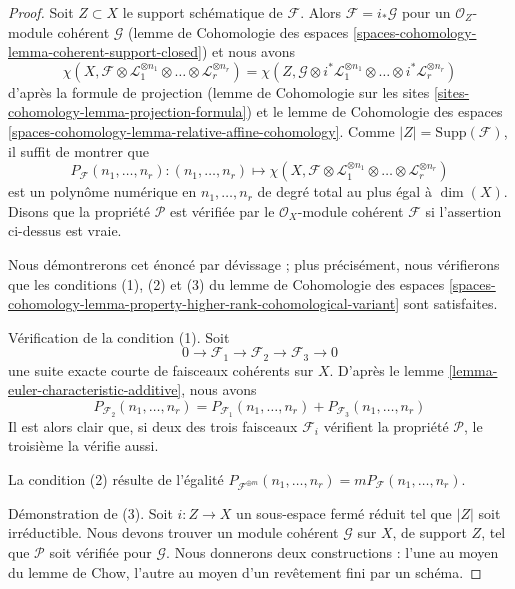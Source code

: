 \begin{proof}
Soit $Z \subset X$ le support schématique de $\mathcal{F}$.
Alors $\mathcal{F} = i_*\mathcal{G}$ pour un
$\mathcal{O}_Z$-module cohérent $\mathcal{G}$
(lemme de Cohomologie des espaces
\ref{spaces-cohomology-lemma-coherent-support-closed})
et nous avons
$$
\chi(X, \mathcal{F} \otimes
\mathcal{L}_1^{\otimes n_1} \otimes \ldots \otimes
\mathcal{L}_r^{\otimes n_r}) =
\chi(Z, \mathcal{G} \otimes
i^*\mathcal{L}_1^{\otimes n_1} \otimes \ldots \otimes
i^*\mathcal{L}_r^{\otimes n_r})
$$
d'après la formule de projection
(lemme de Cohomologie sur les sites \ref{sites-cohomology-lemma-projection-formula})
et le lemme de Cohomologie des espaces
\ref{spaces-cohomology-lemma-relative-affine-cohomology}.
Comme $|Z| = \text{Supp}(\mathcal{F})$, il suffit
de montrer que
$$
P_\mathcal{F}(n_1, \ldots, n_r) :
(n_1, \ldots, n_r)
\longmapsto
\chi(X, \mathcal{F} \otimes
\mathcal{L}_1^{\otimes n_1} \otimes \ldots \otimes
\mathcal{L}_r^{\otimes n_r})
$$
est un polynôme numérique en $n_1, \ldots, n_r$ de degré total au
plus égal à $\dim(X)$. Disons que la propriété $\mathcal{P}$ est vérifiée par le
$\mathcal{O}_X$-module cohérent $\mathcal{F}$ si l'assertion ci-dessus est vraie.

\medskip\noindent
Nous démontrerons cet énoncé par dévissage ; plus précisément, nous
vérifierons que les conditions (1), (2) et (3) du
lemme de Cohomologie des espaces
\ref{spaces-cohomology-lemma-property-higher-rank-cohomological-variant}
sont satisfaites.

\medskip\noindent
Vérification de la condition (1). Soit
$$
0 \to \mathcal{F}_1 \to \mathcal{F}_2 \to \mathcal{F}_3 \to 0
$$
une suite exacte courte de faisceaux cohérents sur $X$.
D'après le lemme \ref{lemma-euler-characteristic-additive}, nous avons
$$
P_{\mathcal{F}_2}(n_1, \ldots, n_r) =
P_{\mathcal{F}_1}(n_1, \ldots, n_r) +
P_{\mathcal{F}_3}(n_1, \ldots, n_r)
$$
Il est alors clair que, si deux des trois faisceaux $\mathcal{F}_i$
vérifient la propriété $\mathcal{P}$, le troisième la vérifie aussi.

\medskip\noindent
La condition (2) résulte de l'égalité
$P_{\mathcal{F}^{\oplus m}}(n_1, \ldots, n_r) =
mP_\mathcal{F}(n_1, \ldots, n_r)$.

\medskip\noindent
Démonstration de (3). Soit $i : Z \to X$ un sous-espace fermé réduit tel que
$|Z|$ soit irréductible. Nous devons trouver un module cohérent $\mathcal{G}$
sur $X$, de support $Z$, tel que $\mathcal{P}$ soit vérifiée pour $\mathcal{G}$.
Nous donnerons deux constructions : l'une au moyen du lemme de Chow, l'autre
au moyen d'un revêtement fini par un schéma.


\end{proof}
